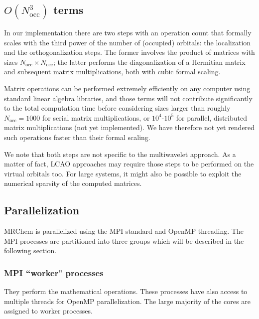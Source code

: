 \documentclass[journal=jctcce, manuscript=article]{achemso}
\begin{document}
\subsection{$O(N_{\mathrm{occ}}^3)$ terms}
\label{sec:N3terms}

In our implementation there are two steps with an operation count that formally scales with the third power of the number of (occupied) orbitals: the localization
and the orthogonalization steps. The former involves the product of matrices with sizes $N_{\mathrm{occ}} \times N_{\mathrm{occ}}$; the latter performs the diagonalization of a Hermitian matrix and subsequent matrix multiplications, both with cubic formal scaling.

Matrix operations can be performed extremely efficiently on any computer using standard linear algebra libraries, and those terms will not contribute significantly to the total computation time before considering sizes larger than roughly $N_{\mathrm{occ}}=1000$ for serial matrix multiplications, or $10^4$-$10^5$ for parallel, distributed matrix multiplications (not yet implemented). We have therefore not yet rendered such operations faster than their formal scaling.

We note that both steps are not specific to the multiwavelet approach. As a matter of fact, \ac{LCAO} approaches may require those steps to be performed on the virtual orbitals too. For large systems, it might also be possible to exploit the numerical sparsity of the computed matrices.


\subsection{Parallelization}

MRChem is parallelized using the \ac{MPI} standard\cite{Pacheco1997-qq,Gropp2014-dz,Gropp2014-qf} and OpenMP threading.\cite{Mattson2019-gl,Van_der_Pas2017-wq}
The MPI processes are partitioned into three groups which will be described in the following section.

\subsubsection{MPI ``worker" processes} 
They perform the mathematical operations. These processes have also access to multiple threads for OpenMP parallelization. The large majority of the cores are assigned to worker processes.
\end{document}
